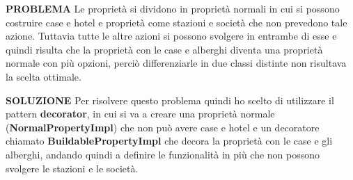 \textbf{PROBLEMA}\newline
Le proprietà si dividono in proprietà normali in cui si possono costruire case e hotel e proprietà come stazioni e società che non prevedono tale azione. 
Tuttavia tutte le altre azioni si possono svolgere in entrambe di esse e quindi risulta che la proprietà con le case e alberghi diventa una proprietà normale con più opzioni, 
perciò differenziarle in due classi distinte non risultava la scelta ottimale.\newline

\textbf{SOLUZIONE}\newline
Per risolvere questo problema quindi ho scelto di utilizzare il pattern \textbf{decorator}, in cui si va a creare una proprietà normale (\textbf{NormalPropertyImpl}) 
che non può avere case e hotel e un decoratore chiamato \textbf{BuildablePropertyImpl} che decora la proprietà con le case e gli alberghi,
andando quindi a definire le funzionalità in più che non possono svolgere le stazioni e le società.\newline

